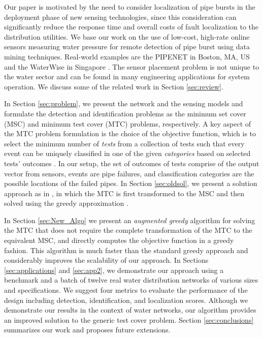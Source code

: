 \documentclass[twocolumn]{autart}
\begin{document}
Our paper is motivated by the need to consider localization of pipe bursts in the deployment phase of new sensing technologies, since this consideration can significantly reduce the response time and overall costs of fault localization to the distribution utilities.
We base our work on the use of low-cost, high-rate online sensors measuring water pressure for remote detection of pipe burst using data mining techniques. Real-world examples are the PIPENET in Boston, MA, US \cite{Stoianov:2007:PWS:1236360.1236396} and the WaterWise in Singapore \cite{allen:smart}. 
The sensor placement problem is not unique to the water sector and can be found in many engineering applications for system operation. We discuss some of the related work in Section \ref{sec:review}.
\vspace{-0.35cm}

In Section \ref{sec:problem}, we present the network and the sensing models and formulate the detection and identification problems as the minimum set cover (MSC) and minimum test cover (MTC) problems, respectively. A key aspect of the MTC problem formulation is the choice of the objective function, which is to select the minimum number of \textit{tests} from a collection of tests such that every event can be uniquely classified in one of the given \textit{categories} based on selected tests' outcomes \cite{Moret1}. In our setup, the set of outcomes of tests comprise of the output vector from sensors, events are pipe failures, and classification categories are the possible locations of the failed pipes. 
In Section \ref{sec:oldsol}, we present a solution approach as in \cite{Halldorsson:2001:AMT:647911.740635,svard2013realizability}, in which the MTC is first transformed to the MSC and then solved using the greedy approximation \cite{Minoux1}. \vspace{-0.25cm}

In Section \ref{sec:New_Algo} we present an \textit{augmented greedy} algorithm for solving the MTC  that does not require the complete transformation of the MTC to the equivalent MSC, and directly computes the objective function in a greedy fashion. This algorithm is much faster than the standard greedy approach and considerably improves the scalability of our approach.
In Sections \ref{sec:applications} and \ref{sec:app2}, we demonstrate our approach using a benchmark and a batch of twelve real water distribution networks of various sizes and specifications. We suggest four metrics to evaluate the performance of the design including detection, identification, and localization scores. Although we demonstrate our results in the context of water networks, our algorithm provides an improved solution to the generic test cover problem.
Section \ref{sec:conclusions} summarizes our work and proposes future extensions.
\end{document}
